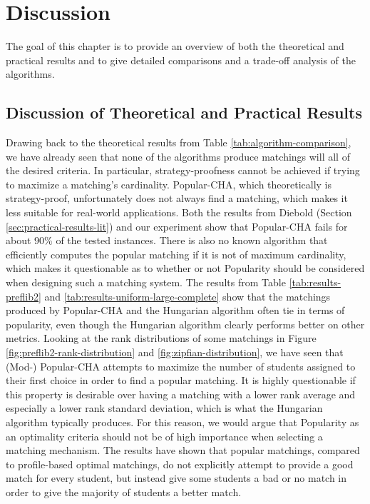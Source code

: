 \section{Discussion}

The goal of this chapter is to provide an overview of both the theoretical and practical results and to give detailed comparisons and a trade-off analysis of the algorithms.

\subsection{Discussion of Theoretical and Practical Results}
Drawing back to the theoretical results from Table \ref{tab:algorithm-comparison}, we have already seen that none of the algorithms produce matchings will all of the desired criteria. In particular, strategy-proofness cannot be achieved if trying to maximize a matching's cardinality. Popular-CHA, which theoretically is strategy-proof, unfortunately does not always find a matching, which makes it less suitable for real-world applications. Both the results from Diebold (Section \ref{sec:practical-results-lit}) and our experiment show that Popular-CHA fails for about 90\% of the tested instances. There is also no known algorithm that efficiently computes the popular matching if it is not of maximum cardinality, which makes it questionable as to whether or not Popularity should be considered when designing such a matching system. The results from Table \ref{tab:results-preflib2} and \ref{tab:results-uniform-large-complete} show that the matchings produced by Popular-CHA and the Hungarian algorithm often tie in terms of popularity, even though the Hungarian algorithm clearly performs better on other metrics. Looking at the rank distributions of some matchings in Figure \ref{fig:preflib2-rank-distribution} and \ref{fig:zipfian-distribution}, we have seen that (Mod-) Popular-CHA attempts to maximize the number of students assigned to their first choice in order to find a popular matching. It is highly questionable if this property is desirable over having a matching with a lower rank average and especially a lower rank standard deviation, which is what the Hungarian algorithm typically produces. For this reason, we would argue that Popularity as an optimality criteria should not be of high importance when selecting a matching mechanism. The results have shown that popular matchings, compared to profile-based optimal matchings, do not explicitly attempt to provide a good match for every student, but instead give some students a bad or no match in order to give the majority of students a better match.


